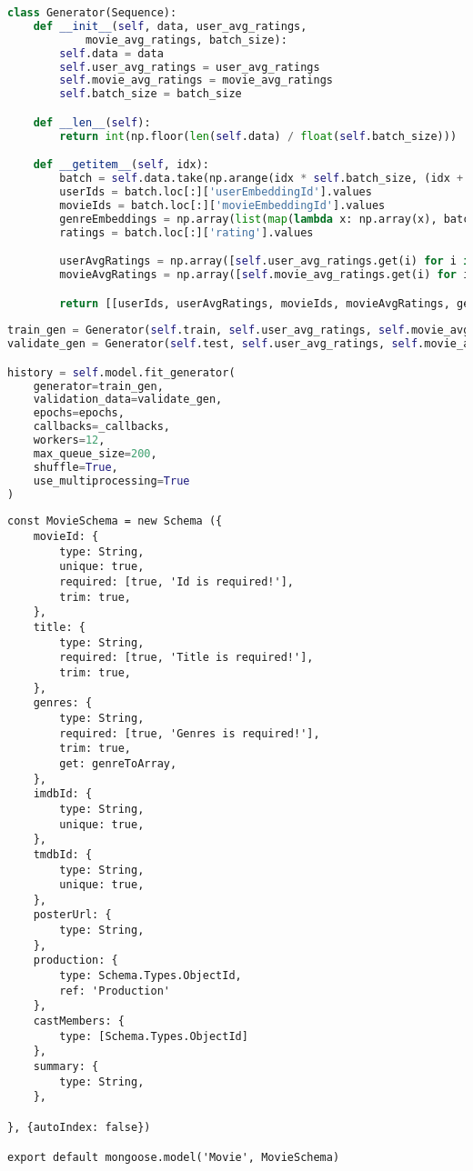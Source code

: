 \begin{lstlisting}[language=Python, caption=Generator class and usage, basicstyle=\tiny, label=generator]
class Generator(Sequence):
    def __init__(self, data, user_avg_ratings,
            movie_avg_ratings, batch_size):
        self.data = data
        self.user_avg_ratings = user_avg_ratings
        self.movie_avg_ratings = movie_avg_ratings
        self.batch_size = batch_size

    def __len__(self):
        return int(np.floor(len(self.data) / float(self.batch_size)))

    def __getitem__(self, idx):
        batch = self.data.take(np.arange(idx * self.batch_size, (idx + 1) * self.batch_size, 1), 0)
        userIds = batch.loc[:]['userEmbeddingId'].values
        movieIds = batch.loc[:]['movieEmbeddingId'].values
        genreEmbeddings = np.array(list(map(lambda x: np.array(x), batch.loc[:]['genreEmbedding'].values)))
        ratings = batch.loc[:]['rating'].values

        userAvgRatings = np.array([self.user_avg_ratings.get(i) for i in userIds.tolist()])
        movieAvgRatings = np.array([self.movie_avg_ratings.get(i) for i in movieIds.tolist()])

        return [[userIds, userAvgRatings, movieIds, movieAvgRatings, genreEmbeddings], ratings]
    
train_gen = Generator(self.train, self.user_avg_ratings, self.movie_avg_ratings, self.batch_size)
validate_gen = Generator(self.test, self.user_avg_ratings, self.movie_avg_ratings, self.batch_size)

history = self.model.fit_generator(
    generator=train_gen,
    validation_data=validate_gen,
    epochs=epochs,
    callbacks=_callbacks,
    workers=12,
    max_queue_size=200,
    shuffle=True,
    use_multiprocessing=True
)
\end{lstlisting}
    
\begin{lstlisting}[caption=Movie Schema, basicstyle=\tiny, label=movie_schema]
const MovieSchema = new Schema ({
    movieId: {
        type: String,
        unique: true,
        required: [true, 'Id is required!'],
        trim: true,
    },
    title: {
        type: String,
        required: [true, 'Title is required!'],
        trim: true,
    },
    genres: {
        type: String,
        required: [true, 'Genres is required!'],
        trim: true,
        get: genreToArray,
    },
    imdbId: {
        type: String,
        unique: true,
    },
    tmdbId: {
        type: String,
        unique: true,
    },
    posterUrl: {
        type: String,
    },
    production: {
        type: Schema.Types.ObjectId,
        ref: 'Production'
    },
    castMembers: {
        type: [Schema.Types.ObjectId]
    },
    summary: {
        type: String,
    },

}, {autoIndex: false})

export default mongoose.model('Movie', MovieSchema)

\end{lstlisting}


